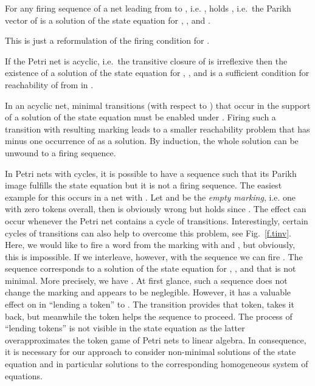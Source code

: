 \documentclass{LMCS}
\begin{document}
\begin{prop}
For any firing sequence  of a net  leading from  to , i.e. ,
holds , i.e.\ the Parikh vector of  is a solution of the state equation for
, , and . 
\end{prop}
This is just a reformulation of the firing condition for .

\begin{prop}
If the Petri net is acyclic, i.e.~the transitive closure of  is irreflexive then the existence of a
solution of the state equation for , , and  is a sufficient condition for reachability of 
from  in .
\end{prop}
In an acyclic net, minimal transitions (with respect to ) that occur in the support of a solution  of the state equation
must be enabled under . Firing such a transition with resulting marking  leads to a smaller
reachability problem  that has  minus one occurrence of  as a solution. By induction, the whole
solution can be unwound to a firing sequence.

In Petri nets with cycles, it is possible to have a sequence  such that its Parikh image fulfills the state equation but it is
not a firing sequence. 
The easiest example for this occurs in a net  with .
Let  and  be the {\em empty marking}, i.e. one with zero tokens overall, then  is
obviously wrong but  holds since . The effect can occur whenever the Petri net
contains a cycle of transitions. Interestingly, certain cycles of transitions can also help to overcome
this problem, see Fig.~\ref{f.tinv}. Here, we would like to fire a word  from the marking  with
 and , but obviously, this is impossible. If we interleave, however,  with the sequence 
we can fire . The sequence  corresponds to a solution of the state equation for , , and  that is not minimal.
More precisely, we have . At first glance, such a sequence does not change the marking and appears to be neglegible.
However, it has a valuable effect on  in ``lending a token'' to . The transition  provides that token,  takes it back, but meanwhile the token
helps the sequence  to proceed. The process of ``lending tokens'' is not visible in the state equation as the latter overapproximates the
token game of Petri nets to linear algebra. In consequence, it is necessary for our approach to consider non-minimal solutions of the state equation
and in particular solutions to the corresponding homogeneous system of equations.
\end{document}

